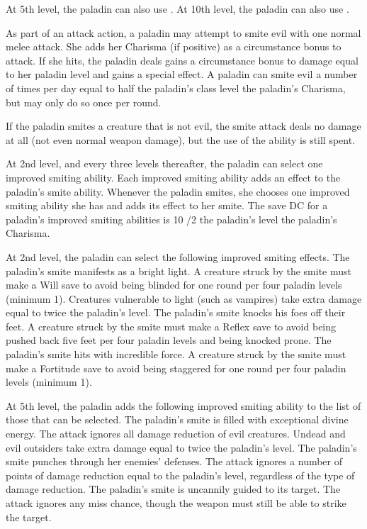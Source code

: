 At 5th level, the paladin can also use . At 10th level, the paladin can also use .

 As part of an attack action, a paladin may attempt to smite evil with one normal melee attack. She adds her Charisma (if positive) as a circumstance bonus to attack. If she hits, the paladin deals gains a circumstance bonus to damage equal to her paladin level and gains a special effect.  A paladin can smite evil a number of times per day equal to half the paladin's class level \add the paladin's Charisma, but may only do so once per round.

If the paladin smites a creature that is not evil, the smite attack deals no damage at all (not even normal weapon damage), but the use of the ability is still spent.

 At 2nd level, and every three levels thereafter, the paladin can select one improved smiting ability. Each improved smiting ability adds an effect to the paladin's smite ability. Whenever the paladin smites, she chooses one improved smiting ability she has and adds its effect to her smite. The save DC for a paladin's improved smiting abilities is 10 /2 the paladin's level \add the paladin's Charisma.
\par At 2nd level, the paladin can select the following improved smiting effects.
 The paladin's smite manifests as a bright light. A creature struck by the smite must make a Will save to avoid being blinded for one round per four paladin levels (minimum 1). Creatures vulnerable to light (such as vampires) take extra damage equal to twice the paladin's level.
 The paladin's smite knocks his foes off their feet. A creature struck by the smite must make a Reflex save to avoid being pushed back five feet per four paladin levels and being knocked prone.
 The paladin's smite hits with incredible force. A creature struck by the smite must make a Fortitude save to avoid being staggered for one round per four paladin levels (minimum 1).

At 5th level, the paladin adds the following improved smiting ability to the list of those that can be selected.
 The paladin's smite is filled with exceptional divine energy. The attack ignores all damage reduction of evil creatures. Undead and evil outsiders take extra damage equal to twice the paladin's level.
 The paladin's smite punches through her enemies' defenses. The attack ignores a number of points of damage reduction equal to the paladin's level, regardless of the type of damage reduction.
 The paladin's smite is uncannily guided to its target. The attack ignores any miss chance, though the weapon must still be able to strike the target.

